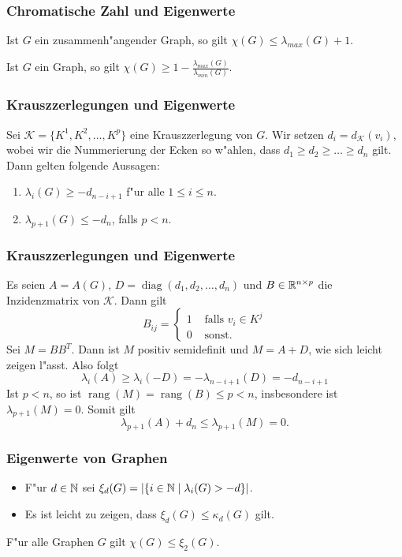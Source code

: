 \documentclass{beamer}
\begin{document}
\begin{frame}[<+->]
  \frametitle{Chromatische Zahl und Eigenwerte}
  \begin{theorem}[Wilf]
    Ist $G$ ein zusammenh"angender Graph, so gilt $\chi(G) \leq \lambda_{max}(G) +1$.
  \end{theorem}
  \begin{theorem}[Hoffman]
    Ist $G$ ein Graph, so gilt $\chi(G) \geq 1- \frac{\lambda_{max}(G)}{\lambda_{min}(G)}$.
  \end{theorem}
\end{frame}
\begin{frame}[<+->]
  \frametitle{Krauszzerlegungen und Eigenwerte}
  \begin{theorem}
    Sei $\mathcal{K} = \{K^{1}, K^{2}, \dots , K^{p} \}$ eine Krauszzerlegung von $G$. Wir setzen $d_i = d_{\mathcal{K}}(v_i)$, wobei wir die Nummerierung der Ecken so w"ahlen, dass $d_1 \geq d_2 \geq \dots \geq d_n$ gilt.
    Dann gelten folgende Aussagen:
    \begin{enumerate}
      \item $\lambda_{i}(G) \geq -d_{n-i+1}$ f"ur alle $1 \leq i \leq n$. 
      \item $\lambda_{p+1}(G) \leq -d_n$, falls $p< n$.
    \end{enumerate}
  \end{theorem}
\end{frame}
\begin{frame}[<+->]
  \frametitle{Krauszzerlegungen und Eigenwerte}

  Es seien $A= A(G)$, $D= \operatorname{diag}(d_1,d_2,\dots,d_n)$ und $B\in{\mathbb{R}}^{n\times p}$ die Inzidenzmatrix von $\mathcal{K}$. Dann gilt
  $$ B_{ij} = \begin{cases}
    1 & \text{ falls } v_i\in K^{j} \\
    0 & \text{ sonst.} 
  \end{cases} $$
  \pause
  Sei $M=BB^{T}$. Dann ist $M$ positiv semidefinit und $M=A+D$, wie sich leicht zeigen l"asst. \pause Also folgt 
  $$\lambda_{i}(A) \geq \lambda_{i}(-D) = -\lambda_{n-i+1}(D) = -d_{n-i+1}$$
  \pause
  Ist $p < n$, so ist $\operatorname{rang}(M) = \operatorname{rang} (B) \leq p < n$, insbesondere ist $\lambda_{p+1}(M) = 0$. 
  \pause
  Somit gilt
  $$\lambda_{p+1}(A) + d_n \leq \lambda_{p+1}(M) = 0. $$
\end{frame}

\begin{frame}[<+->]
  \frametitle{Eigenwerte von Graphen}
  \begin{itemize}[<+->]
    \item F"ur $d\in {\mathbb{N}}$ sei $\xi_{d}(G) = | \{i \in {\mathbb{N}} \;|\; \lambda_{i}(G) > -d \}|$.
    \item Es ist leicht zu zeigen, dass $\xi_{d}(G) \leq \kappa_{d}(G)$ gilt.
  \end{itemize}
  \begin{conjecture}
    F"ur alle Graphen $G$ gilt $\chi(G) \leq \xi_{2}(G)$.
  \end{conjecture}
\end{frame}
\end{document}
